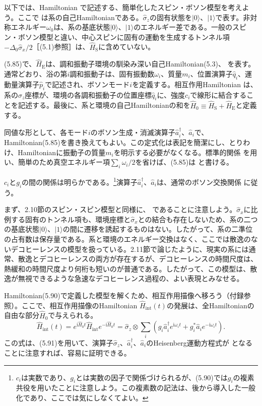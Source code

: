 以下では、Hamiltonian
で記述する、簡単化したスピン・ボソン模型を考えよう。ここで
は系の自己Hamiltonianである。$\hat\sigma_z$の固有状態を$|0\rangle$、$|1\rangle$で表す。非対称エネルギー$\omega_0$は、系の基底状態$|0\rangle$、$|1\rangle$のエネルギー差である。一般のスピン・ボソン模型と違い、中心スピンに固有の運動を生成するトンネル項$-\Delta_0\hat\sigma_x/2$［(5.1)参照］は、$\hat H_{\mathrm S}$に含めていない。

(5.85)で、$\hat H_{\mathrm E}$は、調和振動子環境の馴染み深い自己Hamiltonian(5.3)、
を表す。通常どおり、浴の第$i$調和振動子は、固有振動数$\omega_i$、質量$m_i$、位置演算子$\hat q_i$、運動量演算子$\hat p_i$で記述され、ボソンモード$i$を定義する。相互作用Hamiltonian
は、系の$\hat\sigma_z$座標が、環境の各調和振動子の位置座標$\hat q_i$に、強度$c_i$で線形に結合することを記述する。最後に、系と環境の自己Hamiltonianの和を$\hat H_0\equiv\hat H_{\mathrm S}+\hat H_{\mathrm E}$と定義する。

同値な形として、各モード$i$のボソン生成・消滅演算子$\hat a_i^{\dagger}$、$\hat a_i$で、Hamiltonian(5.85)を書き換えてもよい。この定式化は表記を簡潔にし、とりわけ、Hamiltonianに振動子の質量$m_i$を明示する必要がなくなる。標準的関係
を用い、簡単のため真空エネルギー項$\sum_i\omega_i/2$を省けば、(5.85)は
と書ける。

\hypertarget{srcpage:209}{}\label{srcpage:209}
$c_i$と$g_i$の間の関係は明らかである。\footnote{$c_i$は実数であり、$g_i$とは実数の因子で関係づけられるが、(5.90)では$g_i$の複素共役を用いたことに注意しよう。この複素数の記法は、後から導入した一般化であり、ここでは気にしなくてよい。}演算子$\hat a_i^{\dagger}$、$\hat a_i$は、通常のボソン交換関係
に従う。

まず、2.10節のスピン・スピン模型と同様に、
であることに注意しよう。$\hat\sigma_x$に比例する固有のトンネル項も、環境座標と$\hat\sigma_x$との結合も存在しないため、系の二つの基底状態$|0\rangle$、$|1\rangle$の間に遷移を誘起するものはない。したがって、系の二準位の占有数は保存量である。系と環境のエネルギー交換はなく、ここでは散逸のないデコヒーレンスの模型を扱っている。2.11節で論じたように、現実の系には通常、散逸とデコヒーレンスの両方が存在するが、デコヒーレンスの時間尺度は、熱緩和の時間尺度より何桁も短いのが普通である。したがって、この模型は、散逸が無視できるような急速なデコヒーレンス過程の、よい表現とみなせる。

Hamiltonian(5.90)で定義した模型を解くため、相互作用描像へ移ろう（付録参照）。ここで、相互作用描像のHamiltonian $\hat H_{\mathrm{int}}(t)$の発展は、全Hamiltonianの自由な部分$\hat H_0$で与えられる。
\begin{equation}
\hat H_{\mathrm{int}}(t)=e^{\mathrm i\hat H_0t}\hat H_{\mathrm{int}}e^{-\mathrm i\hat H_0t}
=\hat\sigma_z\otimes\sum_i(g_i\hat a_i^{\dagger}e^{\mathrm i\omega_it}+g_i^*\hat a_ie^{-\mathrm i\omega_it}).
\tag{5.93}
\end{equation}
この式は、(5.91)を用いて、演算子$\hat\sigma_z$、$\hat a_i^{\dagger}$、$\hat a_i$のHeisenberg運動方程式が
となることに注意すれば、容易に証明できる。

